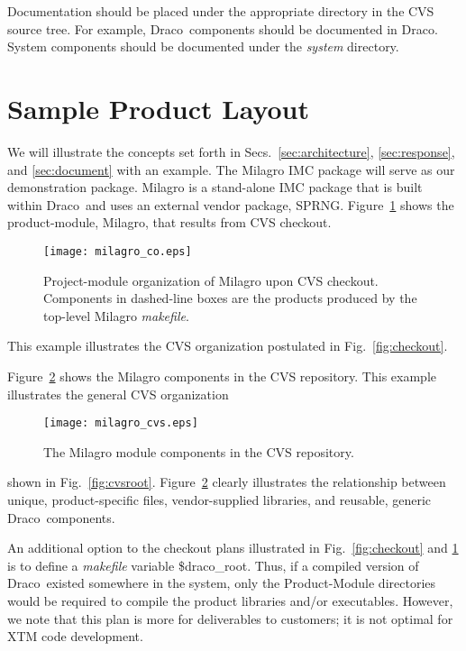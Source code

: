 \documentclass[11pt]{../tex/rnote}
\newcommand{\draco}{\textsf{Draco}}
\newcommand{\pkg}[1]{\textsf{#1}}
\newcommand{\dir}[1]{\textsl{#1}}
\begin{document}
Documentation should  be placed under the appropriate directory in 
the CVS source tree.  For example, \draco\ components should be
documented in \draco.  \pkg{System} components should be documented
under the \dir{system} directory.


\section{Sample Product Layout}

We will illustrate the concepts set forth in
Secs.~\ref{sec:architecture}, \ref{sec:response}, and
\ref{sec:document} with an example.  The \pkg{Milagro} IMC package
will serve as our demonstration package.  \pkg{Milagro} is a
stand-alone IMC package that is built within \draco\ and uses an
external vendor package, \pkg{SPRNG}.  Figure~\ref{fig:milagro_co}
shows the product-module, \pkg{Milagro}, that results from CVS
checkout.
\begin{figure}
  \centerline{\texttt{[image: milagro\_co.eps]}}
  \caption{Project-module organization of \pkg{Milagro} upon CVS
    checkout.  Components in dashed-line boxes are the products
    produced by the top-level \pkg{Milagro} \dir{makefile}.}
  \label{fig:milagro_co}
\end{figure}
This example illustrates the CVS organization postulated in
Fig.~\ref{fig:checkout}. 

Figure~\ref{fig:milagro_cvs} shows the \pkg{Milagro} components in the 
CVS repository.  This example illustrates the general CVS organization 
\begin{figure}
  \centerline{\texttt{[image: milagro\_cvs.eps]}}
  \caption{The \pkg{Milagro} module components in the CVS repository.}
  \label{fig:milagro_cvs}
\end{figure}
shown in Fig.~\ref{fig:cvsroot}.  Figure~\ref{fig:milagro_cvs} clearly 
illustrates the relationship between unique, product-specific files,
vendor-supplied libraries, and reusable, generic \draco\ components.

An additional option to the checkout plans illustrated in
Fig.~\ref{fig:checkout} and \ref{fig:milagro_co} is to define a
\dir{makefile} variable \$draco\_root.  Thus, if a compiled version of
\draco\ existed somewhere in the system, only the \pkg{Product-Module}
directories would be required to compile the product libraries and/or
executables.  However, we note that this plan is more for deliverables
to customers; it is not optimal for XTM code development.
\end{document}

